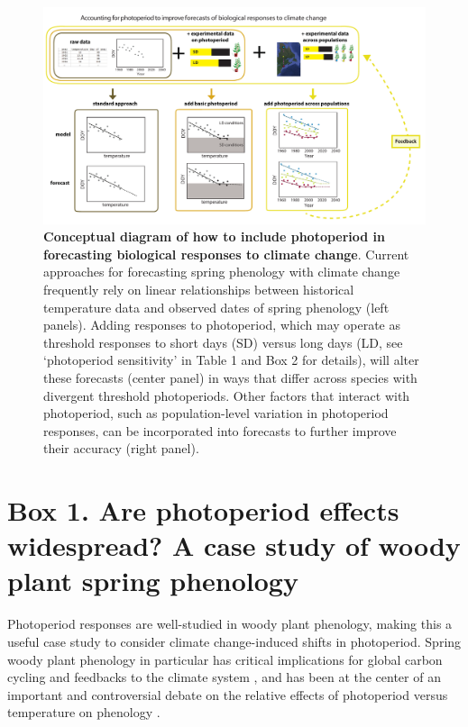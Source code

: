 \documentclass{article}
\begin{document}
\begin{figure}[h]
\includegraphics{..//..//analyses/photoperiod/figures/photocondiag6.pdf} 
\caption{\textbf{Conceptual diagram of how to include photoperiod in forecasting biological responses to climate change}. Current approaches for forecasting spring phenology with climate change frequently rely on linear relationships between historical temperature data and observed dates of spring phenology (left panels). Adding responses to photoperiod, which may operate as threshold responses to short days (SD) versus long days (LD, see `photoperiod sensitivity' in Table 1 and Box 2 for details), will alter these forecasts (center panel) in ways that differ across species with divergent threshold photoperiods. Other factors that interact with photoperiod, such as population-level variation in photoperiod responses, can be incorporated into forecasts to further improve their accuracy (right panel).}
 \label{fig:condiag}
 \end{figure}
\clearpage

 
 \section*{Box 1. Are photoperiod effects widespread? A case study of woody plant spring phenology}
\par Photoperiod responses are well-studied in woody plant phenology, making this a useful case study to consider climate change-induced shifts in photoperiod. Spring woody plant phenology in particular has critical implications for global carbon cycling and feedbacks to the climate system \citep{richardson2013}, and has been at the center of an important and controversial debate on the relative effects of photoperiod versus temperature on phenology \citep[e.g.,][]{fu2019,chuine2010,koerner2010a,koerner2010b}. 
\end{document}
